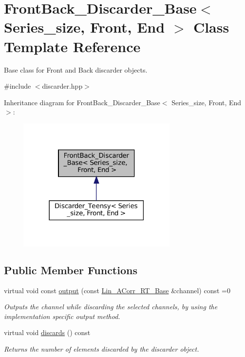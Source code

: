 \hypertarget{classFrontBack__Discarder__Base}{}\section{Front\+Back\+\_\+\+Discarder\+\_\+\+Base$<$ Series\+\_\+size, Front, End $>$ Class Template Reference}
\label{classFrontBack__Discarder__Base}


Base class for Front and Back discarder objects.  




{\ttfamily \#include $<$discarder.\+hpp$>$}



Inheritance diagram for Front\+Back\+\_\+\+Discarder\+\_\+\+Base$<$ Series\+\_\+size, Front, End $>$\+:
\nopagebreak
\begin{figure}[H]
\begin{center}
\leavevmode
\includegraphics[width=225pt]{classFrontBack__Discarder__Base__inherit__graph}
\end{center}
\end{figure}
\subsection*{Public Member Functions}
\begin{DoxyCompactItemize}
\item 
virtual void const \hyperlink{classFrontBack__Discarder__Base_ab8a1d0082f223c31da3c1374c520c4c4}{output} (const \hyperlink{classLin__ACorr__RT__Base}{Lin\+\_\+\+A\+Corr\+\_\+\+R\+T\+\_\+\+Base} \&channel) const =0
\begin{DoxyCompactList}\small\item\em Outputs the channel while discarding the selected channels, by using the implementation specific output method. \end{DoxyCompactList}\item 
virtual void \hyperlink{classFrontBack__Discarder__Base_a9cc129dd2be2f0894646a3db2aa2bebc}{discards} () const
\begin{DoxyCompactList}\small\item\em Returns the number of elements discarded by the discarder object. \end{DoxyCompactList}\end{DoxyCompactItemize}


